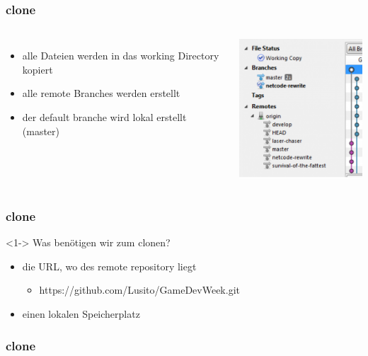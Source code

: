 \begin{frame}
	\frametitle{clone}
	\begin{columns}
			\begin{itemize}
				\item <2-> alle Dateien werden in das working Directory kopiert
				\item <3-> alle remote Branches werden erstellt
				\item <4-> der default branche wird lokal erstellt (master)
			\end{itemize}	
			\includegraphics[scale=1.0]{./pictures/clone_branches}
	\end{columns}
\end{frame}
\begin{frame}
	\frametitle{clone}
	\begin{block} <1-> {Was benötigen wir zum clonen?}
		\begin{itemize}
			\item <1-> die URL, wo des remote repository liegt
			\begin{itemize}
				\item <1-> https://github.com/Lusito/GameDevWeek.git
			\end{itemize}
			\item <2-> einen lokalen Speicherplatz
		\end{itemize}
	\end{block}
\end{frame}
\begin{frame}
	\frametitle{clone}
\end{frame}